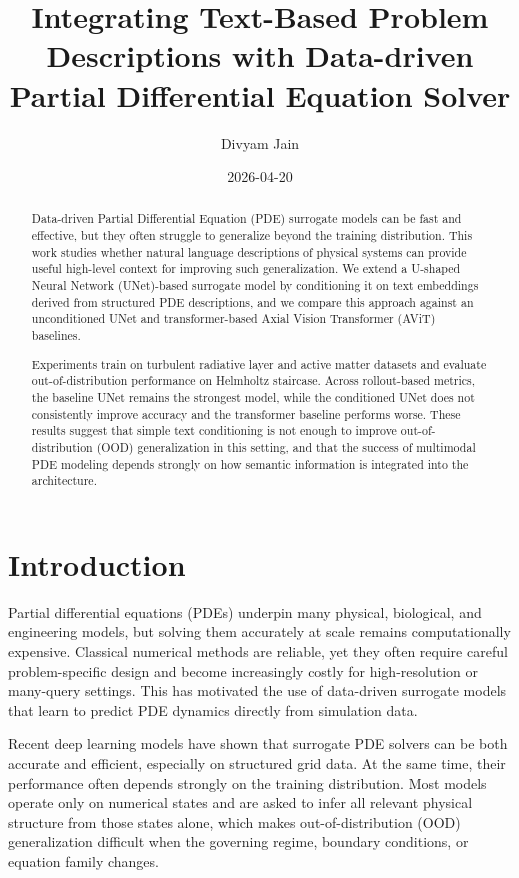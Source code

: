 \documentclass[
]{article}
\title{Integrating Text-Based Problem Descriptions with Data-driven
Partial Differential Equation Solver}
\author{Divyam Jain}
\date{2026-04-20}
\begin{document}
\maketitle
\begin{abstract}
Data-driven Partial Differential Equation (PDE) surrogate models can be
fast and effective, but they often struggle to generalize beyond the
training distribution. This work studies whether natural language
descriptions of physical systems can provide useful high-level context
for improving such generalization. We extend a U-shaped Neural Network
(UNet)-based surrogate model by conditioning it on text embeddings
derived from structured PDE descriptions, and we compare this approach
against an unconditioned UNet and transformer-based Axial Vision
Transformer (AViT) baselines.

Experiments train on turbulent radiative layer and active matter
datasets and evaluate out-of-distribution performance on Helmholtz
staircase. Across rollout-based metrics, the baseline UNet remains the
strongest model, while the conditioned UNet does not consistently
improve accuracy and the transformer baseline performs worse. These
results suggest that simple text conditioning is not enough to improve
out-of-distribution (OOD) generalization in this setting, and that the
success of multimodal PDE modeling depends strongly on how semantic
information is integrated into the architecture.
\end{abstract}


\section{Introduction}\label{introduction}

Partial differential equations (PDEs) underpin many physical,
biological, and engineering models, but solving them accurately at scale
remains computationally expensive. Classical numerical methods are
reliable, yet they often require careful problem-specific design and
become increasingly costly for high-resolution or many-query settings.
This has motivated the use of data-driven surrogate models that learn to
predict PDE dynamics directly from simulation data.

Recent deep learning models have shown that surrogate PDE solvers can be
both accurate and efficient, especially on structured grid data. At the
same time, their performance often depends strongly on the training
distribution. Most models operate only on numerical states and are asked
to infer all relevant physical structure from those states alone, which
makes out-of-distribution (OOD) generalization difficult when the
governing regime, boundary conditions, or equation family changes.
\end{document}
